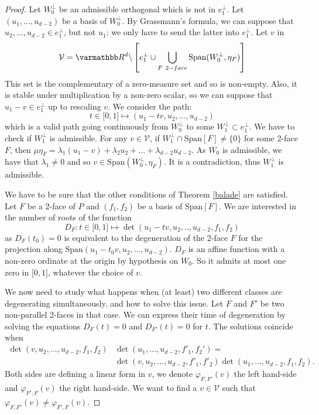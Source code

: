 \documentclass[12pt, notitlepage]{article}
\renewcommand{\mathbb}{\varmathbb}
\theoremstyle{plain}
\theoremstyle{definition}
\theoremstyle{plain}
\theoremstyle{remark}
\theoremstyle{plain}
\theoremstyle{plain}
\newcommand{\R}{\mathbb R}
\newcommand{\vect}{\text{Span}}
\begin{document}
\begin{proof}
    Let $W_0^\perp$ be an admissible orthogonal which is not in $e_1^\perp$. Let $(u_1,...,u_{d-2})$ be a basis of $W_0^\perp$. By Grassmann's formula, we can suppose that $u_2,...,u_{d-2} \in e_1^\perp$, but not $u_1$: we only have to send the latter into $e_1^\perp$. Let $v$ in \[ \mathcal V = \R^d\backslash \left[ e_1^\perp \cup \bigcup_{F~2-face} \vect(W_0^\perp, \eta_F) \right] \] This set is the complementary of a zero-measure set and so is non-empty. Also, it is stable under multiplication by a non-zero scalar, so we can suppose that $u_1-v \in e_1^\perp$ up to rescaling $v$. We consider the path:
    \begin{equation}
    \label{path_1}
        t\in \mathopen[0,1\mathclose] \mapsto (u_1-tv,u_2,...,u_{d-2})
    \end{equation} which is a valid path going continuously from $W_0^\perp$ to some $W_1^\perp\subset e_1^\perp$. We have to check if $W_1^\perp$ is admissible. For any $v\in \mathcal V$, if $W_1^\perp \cap \vect[F] \neq \{0\}$ for some 2-face $F$, then $\mu \eta_F = \lambda_1 (u_1-v) + \lambda_2 u_2 + ... + \lambda_{d-2} u_{d-2}$. As $W_0$ is admissible, we have that $\lambda_1 \neq 0$ and so $v\in \vect(W_0^\perp,\eta_F)$. It is a contradiction, thus $W_1^\perp$ is admissible.
    
    We have to be sure that the other conditions of Theorem \ref{balade} are satisfied. Let $F$ be a 2-face of $P$ and $(f_1,f_2)$ be a basis of $\vect[F]$. We are interested in the number of roots of the function \[ D_F : t\in \mathopen[0,1\mathclose] \mapsto \det(u_1-tv,u_2,..,u_{d-2},f_1,f_2) \] as $D_F(t_0) = 0$ is equivalent to the degeneration of the 2-face $F$ for the projection along $\vect(u_1-t_0v,u_2,...,u_{d-2})$. $D_F$ is an affine function with a non-zero ordinate at the origin by hypothesis on $W_0$. So it admits at most one zero in $\mathopen [0,1  \mathclose]$, whatever the choice of $v$. 
    
    We now need to study what happens when (at least) two different classes are degenerating simultaneously, and how to solve this issue. Let $F$ and $F'$ be two non-parallel 2-faces in that case. We can express their time of degeneration by solving the equations $D_F(t)=0$ and $D_{F'}(t)=0$ for $t$. The solutions coincide when \begin{align*}
        \det(v,u_2,...,u_{d-2},f_1,f_2)&\det(u_1,...,u_{d-2},f'_1,f_2') =\\
        & \det(v,u_2,...,u_{d-2},f'_1,f'_2)\det(u_1,...,u_{d-2},f_1,f_2).
     \end{align*} Both sides are defining a linear form in $v$, we denote $\varphi_{F,F'}(v)$ the left hand-side and $\varphi_{F',F}(v)$ the right hand-side. We want to find a $v\in \mathcal{V}$ such that $\varphi_{F,F'}(v) \neq \varphi_{F',F}(v)$.
     

\end{proof}
\end{document}
